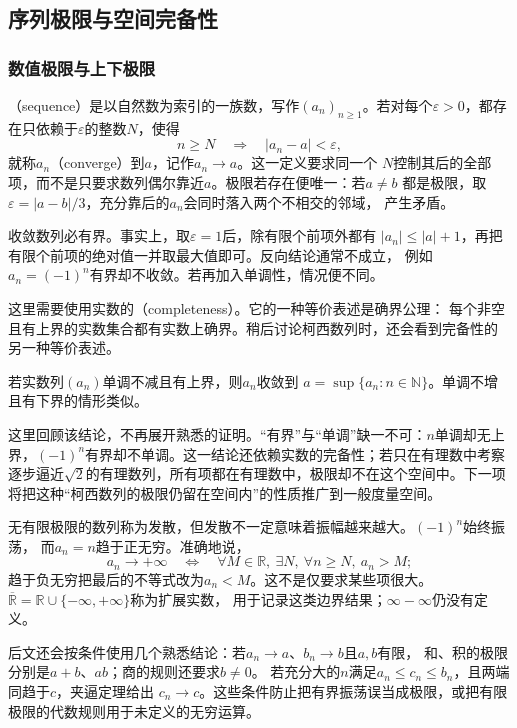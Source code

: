 \subsection{序列极限与空间完备性}
\subsubsection{数值极限与上下极限}

（sequence）是以自然数为索引的一族数，写作$(a_n)_{n\geq 1}$。若对每个$\varepsilon>0$，都存在只依赖于$\varepsilon$的整数$N$，使得
\[   n\geq N\quad\Longrightarrow\quad |a_n-a|<\varepsilon, \]
就称$a_n$（converge）到$a$，记作$a_n\to a$。这一定义要求同一个 $N$控制其后的全部项，而不是只要求数列偶尔靠近$a$。极限若存在便唯一：若$a\neq b$ 都是极限，取$\varepsilon=|a-b|/3$，充分靠后的$a_n$会同时落入两个不相交的邻域， 产生矛盾。

收敛数列必有界。事实上，取$\varepsilon=1$后，除有限个前项外都有 $|a_n|\leq |a|+1$，再把有限个前项的绝对值一并取最大值即可。反向结论通常不成立， 例如$a_n=(-1)^n$有界却不收敛。若再加入单调性，情况便不同。

这里需要使用实数的（completeness）。它的一种等价表述是确界公理：
每个非空且有上界的实数集合都有实数上确界。稍后讨论柯西数列时，还会看到完备性的
另一种等价表述。
\begin{theorem}[单调有界收敛定理]
\label{thm:analysis-monotone-bounded-sequence}
若实数列$(a_n)$单调不减且有上界，则$a_n$收敛到 $a=\sup\{a_n:n\in\mathbb{N}\}$。单调不增且有下界的情形类似。
\end{theorem}
这里回顾该结论，不再展开熟悉的证明。“有界”与“单调”缺一不可：$n$单调却无上界，$(-1)^n$有界却不单调。这一结论还依赖实数的完备性；若只在有理数中考察逐步逼近$\sqrt{2}$的有理数列，所有项都在有理数中，极限却不在这个空间中。下一项将把这种“柯西数列的极限仍留在空间内”的性质推广到一般度量空间。

无有限极限的数列称为发散，但发散不一定意味着振幅越来越大。$(-1)^n$始终振荡，
而$a_n=n$趋于正无穷。准确地说，
\[
 a_n\to+\infty
 \quad\Longleftrightarrow\quad
 \forall M\in\mathbb R,\ \exists N,\ \forall n\geq N,\ a_n>M;
\]
趋于负无穷把最后的不等式改为$a_n<M$。这不是仅要求某些项很大。
$\overline{\mathbb R}=\mathbb R\cup\{-\infty,+\infty\}$称为扩展实数，
用于记录这类边界结果；$\infty-\infty$仍没有定义。

后文还会按条件使用几个熟悉结论：若$a_n\to a$、$b_n\to b$且$a,b$有限，
和、积的极限分别是$a+b$、$ab$；商的规则还要求$b\neq0$。
若充分大的$n$满足$a_n\leq c_n\leq b_n$，且两端同趋于$c$，夹逼定理给出
$c_n\to c$。这些条件防止把有界振荡误当成极限，或把有限极限的代数规则用于未定义的无穷运算。

